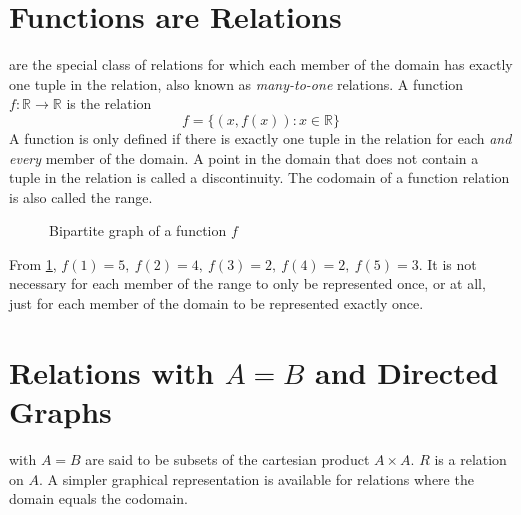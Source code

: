 \documentclass[10pt]{book}
\newcommand{\newthought}[1]{\vspace{0.5\baselineskip}\noindent{\scshape #1}}
\begin{document}
\section{Functions are Relations}
\newthought{Functions} are the special class of relations for which each member of the domain has exactly one tuple in
the relation, also known as \emph{many-to-one} relations. A function $f:\mathbb{R}\to\mathbb{R}$ is the relation
\[f = \{(x,f(x)):x\in \mathbb{R}\}\]
A function is only defined if there is exactly one tuple in the relation for each \emph{and every} member of the domain. A
point in the domain that does not contain a tuple in the relation is called a discontinuity. The codomain of a function relation
is also called the range.
\begin{figure}[h]
  \centering
  \caption{Bipartite graph of a function $f$}
  \label{fig:bipartite_graph_function}
\end{figure}
From \cref{fig:bipartite_graph_function}, $f(1)=5,\ f(2)=4,\ f(3)=2,\ f(4)=2,\ f(5)=3$. It is not necessary for each
member of the range to only be represented once, or at all, just for each member of the domain to be represented exactly once.

\section{Relations with $A=B$ and Directed Graphs}
\newthought{Relations} with $A=B$ are said to be subsets of the cartesian product $A \times A$. $R$ is a relation on $A$.
A simpler graphical representation is available for relations where the domain equals the codomain.
\end{document}
